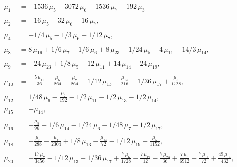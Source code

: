 \documentclass[a4paper,12pt, DIV=14, BCOR=5mm, twoside, headsepline, numbers=noenddot]{scrbook}
\begin{document}
\begin{align}\label{AreaSol1}
    \begin{aligned}
\mu_{{1}}&=-1536\,\mu_{{5}}-3072\,\mu_{{6}}-1536\,\mu_{{7}}-
192\,\mu_{{3}}\\
\\
\mu_{{2}}&=-16\,\mu_{{5}}-32\,\mu_{{6}}-16\,\mu_{{7}},\\
\\
\mu_{{4}}&=-1/4\,\mu_{{5}}-1/3\,\mu_{{6}}+1/12\,\mu_{{7}}, \\
\\
\mu_{{8}}&=8\,
\mu_{{19}}+1/6\,\mu_{{7}}-1/6\,\mu_{{6}}+8\,\mu_{{23}}-1/24\,\mu_{{5}}
-4\,\mu_{{11}}-14/3\,\mu_{{14}}, \\
\\
\mu_{{9}}&=-24\,\mu_{{23}}+1/8\,\mu_{{5
}}+12\,\mu_{{11}}+14\,\mu_{{14}}-24\,\mu_{{19}}, \\
\\
\mu_{{10}}&=-{\frac {5
\,\mu_{{11}}}{36}}-{\frac {\mu_{{6}}}{864}}+{\frac {\mu_{{7}}}{864}}+1
/12\,\mu_{{13}}-{\frac {\mu_{{14}}}{216}}+1/36\,\mu_{{17}}+{\frac {\mu
_{{5}}}{1728}}, \\
\\
\mu_{{12}}&=1/48\,\mu_{{6}}-{\frac {\mu_{{7}}}{192}}-1/2
\,\mu_{{11}}-1/2\,\mu_{{13}}-1/2\,\mu_{{14}}, \\
\\
\mu_{{15}}&=-\mu_{{14}},\\
\\
\mu_{{16}}&=-{\frac {\mu_{{5}}}{96}}-1/6\,\mu_{{14}}-1/24\,\mu_{{6}}-1/
48\,\mu_{{7}}-1/2\,\mu_{{17}}, \\
\\
\mu_{{18}}&=-{\frac {\mu_{{6}}}{288}}-{
\frac {\mu_{{7}}}{2304}}+1/8\,\mu_{{13}}-{\frac {\mu_{{14}}}{72}}-1/12
\,\mu_{{19}}-{\frac {\mu_{{5}}}{1152}}, \\
\\
\mu_{{20}}&=-{\frac {17\,\mu_{{7
}}}{3456}}-1/12\,\mu_{{13}}-1/36\,\mu_{{17}}+{\frac {7\,\mu_{{6}}}{
1728}}-{\frac {7\,\mu_{{19}}}{12}}-{\frac {7\,\mu_{{23}}}{36}}+{\frac 
{7\,\mu_{{5}}}{6912}}+{\frac {7\,\mu_{{11}}}{72}}+{\frac {49\,\mu_{{14
}}}{432}},
\end{aligned}
\end{align}
\end{document}
